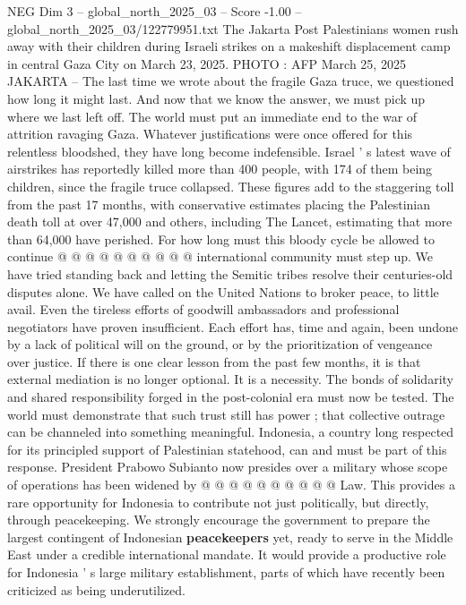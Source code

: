\begin{textsample}{NEG Dim 3 – global\_north\_2025\_03 – Score -1.00 – global\_north\_2025\_03/122779951.txt}  \label{ex:f3_neg_430}
The Jakarta Post Palestinians women rush away with their children during Israeli strikes on a makeshift displacement camp in central Gaza City on March 23, 2025.
PHOTO : AFP March 25, 2025 JAKARTA -- The last time we wrote about the fragile Gaza truce, we questioned how long it might last.
And now that we know the answer, we must pick up where we last left off.
The world must put an immediate end to the war of attrition ravaging Gaza.
Whatever justifications were once offered for this relentless bloodshed, they have long become indefensible.
Israel ' s latest wave of airstrikes has reportedly killed more than 400 people, with 174 of them being children, since the fragile truce collapsed.
These figures add to the staggering toll from the past 17 months, with conservative estimates placing the Palestinian death toll at over 47,000 and others, including The Lancet, estimating that more than 64,000 have perished.
For how long must this bloody cycle be allowed to continue @ @ @ @ @ @ @ @ @ @ international community must step up.
We have tried standing back and letting the Semitic tribes resolve their centuries-old disputes alone.
We have called on the United Nations to broker peace, to little avail.
Even the tireless efforts of goodwill ambassadors and professional negotiators have proven insufficient.
Each effort has, time and again, been undone by a lack of political will on the ground, or by the prioritization of vengeance over justice.
If there is one clear lesson from the past few months, it is that external mediation is no longer optional.
It is a necessity.
The bonds of solidarity and shared responsibility forged in the post-colonial era must now be tested.
The world must demonstrate that such trust still has power ; that collective outrage can be channeled into something meaningful.
Indonesia, a country long respected for its principled support of Palestinian statehood, can and must be part of this response.
President Prabowo Subianto now presides over a military whose scope of operations has been widened by @ @ @ @ @ @ @ @ @ @ Law.
This provides a rare opportunity for Indonesia to contribute not just politically, but directly, through peacekeeping.
We strongly encourage the government to prepare the largest contingent of Indonesian \textbf{peacekeepers} yet, ready to serve in the Middle East under a credible international mandate.
It would provide a productive role for Indonesia ' s large military establishment, parts of which have recently been criticized as being underutilized.

\end{textsample}
